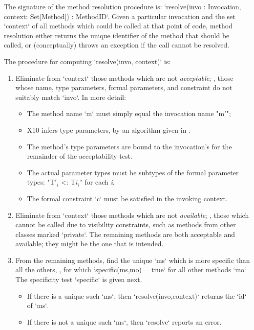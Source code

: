The signature of the method resolution procedure is: 
\xcd`resolve(invo : Invocation, context: Set[Method]) : MethodID`.  
Given a particular invocation and the set \xcd`context` of all methods
which could be called at that point of code, method resolution either returns
the unique identifier of the method that should be called, or (conceptually)
throws an exception if the call cannot be resolved.

The procedure for computing \xcd`resolve(invo, context)` is: 
\begin{enumerate}
\item Eliminate from \xcd`context` those methods which are not {\em
      acceptable}; \viz, those whose name, type parameters, formal parameters,
      and constraint do not suitably match \xcd`invo`.  In more detail:
      \begin{itemize}
      \item The method name \xcd`m` must simply equal the invocation name \xcdmath"m$'$";
      \item X10 infers type parameters, by an algorithm given in .
      \item The method's type parameters are bound to the invocation's for the
            remainder of the acceptability test.
      \item The actual parameter types must be subtypes of the formal
            parameter types:  \xcdmath"T$'_i$ <: T$i_i$" for each {\em i}. 
      \item The formal constraint \xcd`c` must be satisfied in the invoking
            context. 
      \end{itemize}
\item Eliminate from \xcd`context` those methods which are not {\em
      available}; \viz, those which cannot be called due to visibility
      constraints, such as methods from other classes marked \xcd`private`.
      The remaining methods are both acceptable and available; they might be
      the one that is intended.
\item From the remaining methods, find the unique \xcd`ms` which is more specific than all the
      others, \viz, for which \xcd`specific(ms,mo) = true` for all other
      methods \xcd`mo`
      The specificity test \xcd`specific` is given next.
      \begin{itemize}
      \item If there is a unique such \xcd`ms`, then
            \xcd`resolve(invo,context)` returns the \xcd`id` of \xcd`ms`.  
      \item If there is not a unique such \xcd`ms`, then \xcd`resolve` reports
            an error.
      \end{itemize}

\end{enumerate}

